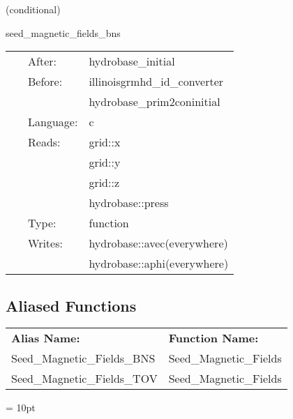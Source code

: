 \vspace{5mm}

   (conditional) 

\hspace{5mm} seed\_magnetic\_fields\_bns 

\hspace{5mm}{\it set up binary neutron star seed magnetic fields. } 


\hspace{5mm}

 \begin{tabular*}{160mm}{cll} 
~ & After:  & hydrobase\_initial \\ 
~ & Before:  & illinoisgrmhd\_id\_converter \\ 
~& ~ &hydrobase\_prim2coninitial\\ 
~ & Language:  & c \\ 
~ & Reads:  & grid::x \\ 
~& ~ &grid::y\\ 
~& ~ &grid::z\\ 
~& ~ &hydrobase::press\\ 
~ & Type:  & function \\ 
~ & Writes:  & hydrobase::avec(everywhere) \\ 
~& ~ &hydrobase::aphi(everywhere)\\ 
\end{tabular*} 


\subsection*{Aliased Functions}

\hspace{5mm}

 \begin{tabular*}{160mm}{ll} 

{\bf Alias Name:} ~~~~~~~ & {\bf Function Name:} \\ 
Seed\_Magnetic\_Fields\_BNS & Seed\_Magnetic\_Fields \\ 
Seed\_Magnetic\_Fields\_TOV & Seed\_Magnetic\_Fields \\ 
\end{tabular*} 



\vspace{5mm}\parskip = 10pt 
